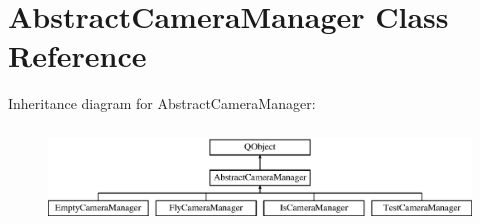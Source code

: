 \hypertarget{class_abstract_camera_manager}{\section{Abstract\-Camera\-Manager Class Reference}
\label{class_abstract_camera_manager}
}
Inheritance diagram for Abstract\-Camera\-Manager\-:\begin{figure}[H]
\begin{center}
\leavevmode
\includegraphics[height=2.592592cm]{class_abstract_camera_manager}
\end{center}
\end{figure}
